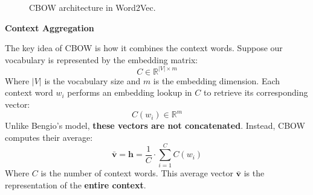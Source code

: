 \begin{figure}[!htp]
    \caption{CBOW architecture in Word2Vec.\cite{mikolov2013efficient}}
    \label{fig:cbow-architecture-repeated}
\end{figure}

\begin{flushleft}
    \textcolor{Green3}{ \textbf{Context Aggregation}}
\end{flushleft}
The key idea of CBOW is how it combines the context words. Suppose our vocabulary is represented by the embedding matrix:
\begin{equation*}
    C \in \mathbb{R}^{\left|V\right| \times m}
\end{equation*}
Where $\left|V\right|$ is the vocabulary size and $m$ is the embedding dimension. Each context word $w_i$ performs an embedding lookup in $C$ to retrieve its corresponding vector:
\begin{equation*}
    C\left(w_i\right) \in \mathbb{R}^{m}
\end{equation*}
Unlike Bengio's model, \textbf{these vectors are not concatenated}. Instead, CBOW computes their average:
\begin{equation}
    \bar{\mathbf{v}} = \mathbf{h} = \frac{1}{C} \cdot \sum_{i=1}^{C} C\left(w_i\right)
\end{equation}
Where $C$ is the number of context words. This average vector $\bar{\mathbf{v}}$ is the representation of the \textbf{entire context}.

